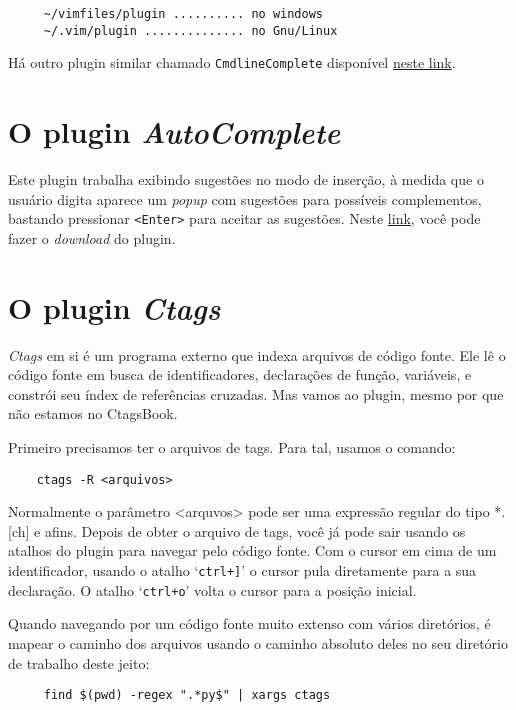 \begin{verbatim}
     ~/vimfiles/plugin .......... no windows
     ~/.vim/plugin .............. no Gnu/Linux
\end{verbatim}

Há outro plugin similar chamado {\tt CmdlineComplete} disponível  
\href{http://www.vim.org/scripts/script.php?script\_id=2222}{neste link}.


\section{O plugin {\em AutoComplete}}\label{sec:O Plugin AutoComplete}
Este plugin trabalha exibindo sugestões no modo de inserção, à
medida que o usuário digita aparece um {\em popup} com sugestões para possíveis
complementos, bastando pressionar {\tt <Enter>} para aceitar as sugestões.
Neste \href{http://www.vim.org/scripts/script.php?script\_id=1879}{link}, você pode
fazer o {\em download} do plugin.

\section{O plugin {\em Ctags}}
\label{sec:O Plugin Ctags}

{\em Ctags} em si é um programa externo que indexa arquivos de código fonte. Ele lê
o código fonte em busca de identificadores, declarações de função, variáveis, e constrói seu 
índex de referências cruzadas. Mas vamos ao plugin, mesmo por que não estamos no CtagsBook.

Primeiro precisamos ter o arquivos de tags. Para tal, usamos o comando:

\begin{verbatim}
    ctags -R <arquivos>
\end{verbatim}

Normalmente o parâmetro <arquvos> pode ser uma expressão regular do tipo *.[ch]
e afins. Depois de obter o arquivo de tags, você já pode sair usando os atalhos
do plugin para navegar pelo código fonte.  Com o cursor em cima de um
identificador, usando o atalho `\verb|ctrl+]|' o cursor pula diretamente para a
sua declaração. O atalho `\verb|ctrl+o|' volta o cursor para a posição inicial.

{\Large {}} Quando navegando por um código
fonte muito extenso com vários diretórios, é mapear o caminho dos arquivos
usando o caminho absoluto deles no seu diretório de trabalho deste jeito:

\begin{verbatim}
     find $(pwd) -regex ".*py$" | xargs ctags
\end{verbatim}

